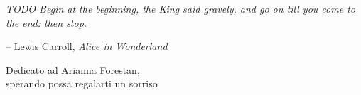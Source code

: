 
\cleardoublepage
{}
\thispagestyle{empty}

\vspace*{3cm}

\epigraph{\itshape TODO Begin at the beginning, the King said gravely, and go on till you come to the end: then stop.}{-- Lewis Carroll, \textit{Alice in Wonderland}}

\medskip

\begin{center}
Dedicato ad Arianna Forestan,\\
sperando possa regalarti un sorriso
\end{center}
